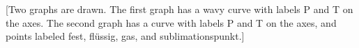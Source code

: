 [Two graphs are drawn. The first graph has a wavy curve with labels P and T on the axes. The second graph has a curve with labels P and T on the axes, and points labeled fest, flüssig, gas, and sublimationspunkt.]